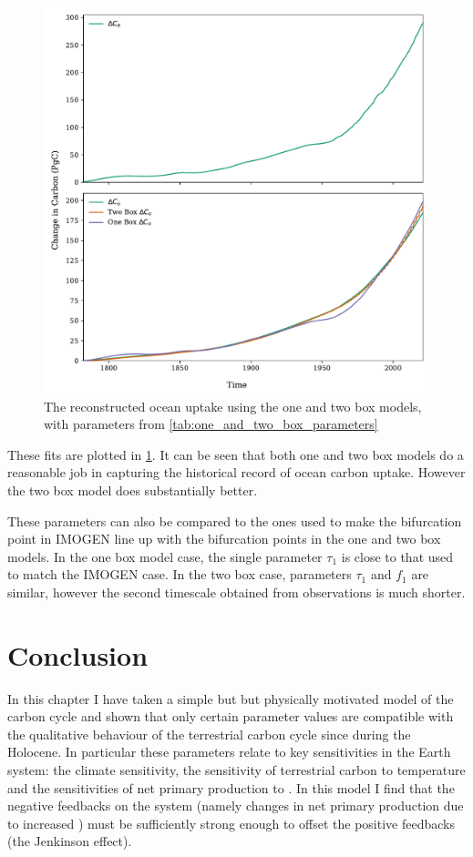 \begin{figure}
  \centering
  \includegraphics[keepaspectratio,width=\textwidth]{gcb_ocean_atmosphere_boxes}
  \caption{The reconstructed ocean uptake using the one and two box models, with parameters from \cref{tab:one_and_two_box_parameters}}
  \label{fig:fits_from_one_and_two}
\end{figure}

These fits are plotted in \cref{fig:fits_from_one_and_two}. It can be seen that both one and two box models do a reasonable job in capturing the
historical record of ocean carbon uptake. However the two box model does substantially better.

These parameters can also be compared to the ones used to make the bifurcation point in IMOGEN line up with the bifurcation points in the one and two box models. In the one box model case,
the single parameter $\tau_1$ is close to that used to match the IMOGEN case. In the two box case, parameters $\tau_1$ and $f_1$ are similar, however the second timescale obtained from observations
is much shorter.

\section{Conclusion}
In this chapter I have taken a simple but but physically motivated model of the carbon cycle and shown that only certain parameter values are compatible with the qualitative behaviour
of the terrestrial carbon cycle since during the Holocene. In particular these parameters relate to key sensitivities in the Earth system: the climate sensitivity, the sensitivity of
terrestrial carbon to temperature and the sensitivities of net primary production to . In this model I find that the negative feedbacks on the system (namely changes in net primary
production due to increased ) must be sufficiently strong enough to offset the positive feedbacks (the Jenkinson effect).

